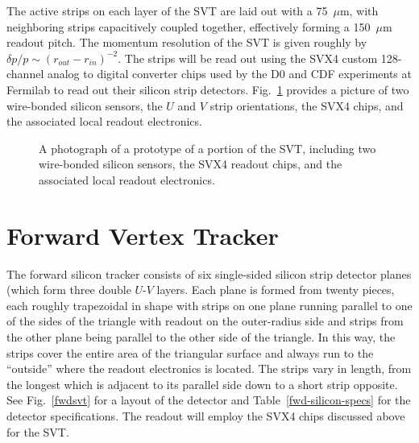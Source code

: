 The active strips on each layer of the SVT are laid out with a 75~$\mu$m,
with neighboring strips capacitively coupled together, effectively
forming a 150~$\mu$m readout pitch.  The momentum resolution of the
SVT is given roughly by $\delta p/p \sim (r_{out} - r_{in})^{-2}$.  The
strips will be read out using the SVX4 custom 128-channel analog to
digital converter chips used by the D0 and CDF experiments at Fermilab
to read out their silicon strip detectors.  Fig.~\ref{strip_layout}
provides a picture of two wire-bonded silicon sensors, the $U$ and $V$
strip orientations, the SVX4 chips, and the associated local readout
electronics.

\vskip 3.0cm

\begin{figure}[hb]
\vspace{7.0cm}
\caption{\small{A photograph of a prototype of a portion of the SVT,
including two wire-bonded silicon sensors, the SVX4 readout chips, and the
associated local readout electronics.}}
\label{strip_layout}
\end{figure}

\vfil
\eject

\section{Forward Vertex Tracker}

The forward silicon tracker consists of six single-sided silicon strip 
detector planes (which form three double $U$-$V$ layers.  Each plane is 
formed from twenty pieces, each roughly trapezoidal in shape with strips 
on one plane running parallel to one of the sides of the triangle with 
readout on the outer-radius side and strips from the other plane being 
parallel to the other side of the triangle. In this way, the strips cover 
the entire area of the triangular surface and always run to the ``outside'' 
where the readout electronics is located.  The strips vary in length, from 
the longest which is adjacent to its parallel side down to a short strip 
opposite. See Fig.~\ref{fwdsvt} for a layout of the detector and 
Table~\ref{fwd-silicon-specs} for the detector specifications.  The readout 
will employ the SVX4 chips discussed above for the SVT.

